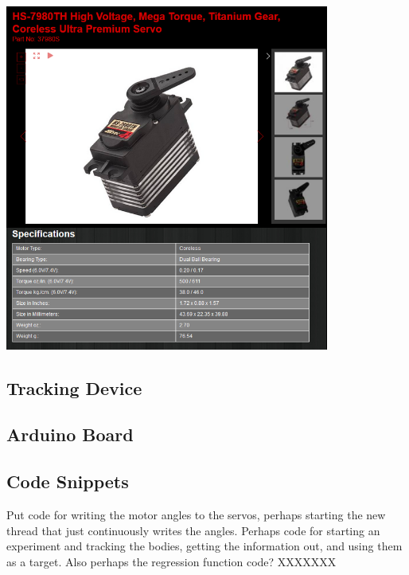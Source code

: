 \documentclass[11pt]{article}
\begin{document}
\begin{center}
\includegraphics[width=0.8\textwidth]{images/servoSpecs.png}
\label{figure:servoSpes}
\end{center}


\subsection{Tracking Device}
\subsection{Arduino Board}
\subsection{Code Snippets}
Put code for writing the motor angles to the servos, perhaps starting the new thread that just continuously writes the angles. Perhaps code for starting an experiment and tracking the bodies, getting the information out, and using them as a target. Also perhaps the regression function code? XXXXXXX
\end{document}
